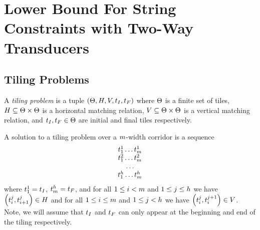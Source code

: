 
\section{Lower Bound For String Constraints with Two-Way Transducers}
\label{sec:two-way-lower}

\subsection{Tiling Problems}

\begin{definition}
    A \emph{tiling problem} is a tuple
    $\left( \Theta, H, V, t_I, t_F \right)$
    where
        $\Theta$ is a finite set of tiles,
        $H \subseteq \Theta \times \Theta$ is a horizontal matching relation,
        $V \subseteq \Theta \times \Theta$ is a vertical matching relation, and
        $t_I, t_F \in \Theta$ are initial and final tiles respectively.
\end{definition}

A solution to a tiling problem over a $m$-width corridor is a sequence
\[
    \begin{array}{c}
        t^1_1 \ldots t^1_m \\
        t^2_1 \ldots t^2_m \\
        \ldots \\
        t^h_1 \ldots t^h_m
    \end{array}
\]
where
$t^1_1 = t_I$,
$t^h_m = t_F$,
and for all
$1 \leq i < m$
and
$1 \leq j \leq h$
we have
$\left( t^j_i, t^j_{i+1} \right) \in H$
and for all
$1 \leq i \leq m$
and
$1 \leq j < h$
we have
$\left( t^j_i, t^{j+1}_i \right) \in V$.
Note, we will assume that $t_I$ and $t_F$ can only appear at the beginning and end of the tiling respectively.

